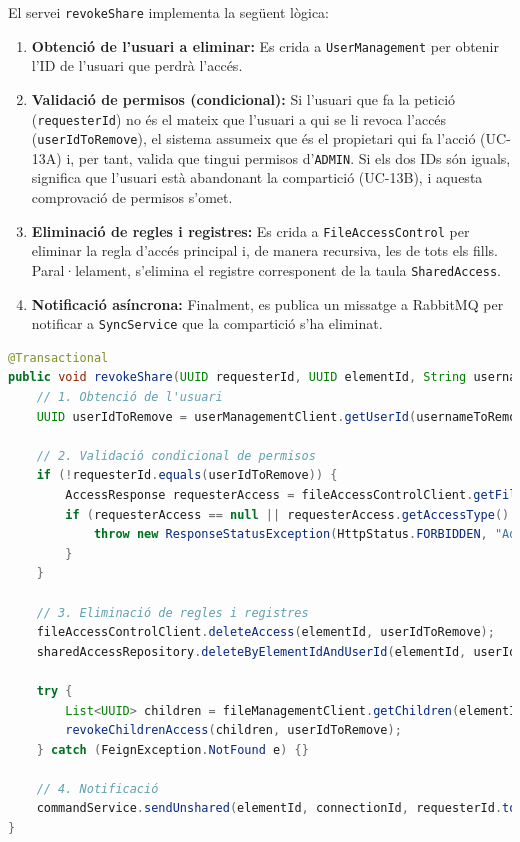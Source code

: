 El servei \texttt{revokeShare} implementa la següent lògica:
\begin{enumerate}
    \item \textbf{Obtenció de l'usuari a eliminar:} Es crida a \texttt{UserManagement} per obtenir l'ID de l'usuari que perdrà l'accés.
    \item \textbf{Validació de permisos (condicional):} Si l'usuari que fa la petició (\texttt{requesterId}) no és el mateix que l'usuari a qui se li revoca l'accés (\texttt{userIdToRemove}), el sistema assumeix que és el propietari qui fa l'acció (UC-13A) i, per tant, valida que tingui permisos d'\texttt{ADMIN}. Si els dos IDs són iguals, significa que l'usuari està abandonant la compartició (UC-13B), i aquesta comprovació de permisos s'omet.
    \item \textbf{Eliminació de regles i registres:} Es crida a \texttt{FileAccessControl} per eliminar la regla d'accés principal i, de manera recursiva, les de tots els fills. Paral·lelament, s'elimina el registre corresponent de la taula \texttt{SharedAccess}.
    \item \textbf{Notificació asíncrona:} Finalment, es publica un missatge a RabbitMQ per notificar a \texttt{SyncService} que la compartició s'ha eliminat.
\end{enumerate}

\begin{lstlisting}[language=Java, caption={Lògica per revocar un accés a `FileSharingService`}]
@Transactional
public void revokeShare(UUID requesterId, UUID elementId, String usernameToRemove, String connectionId) {
    // 1. Obtenció de l'usuari
    UUID userIdToRemove = userManagementClient.getUserId(usernameToRemove);

    // 2. Validació condicional de permisos
    if (!requesterId.equals(userIdToRemove)) {
        AccessResponse requesterAccess = fileAccessControlClient.getFileAccess(elementId, requesterId);
        if (requesterAccess == null || requesterAccess.getAccessType() != 3) { // 3 = ADMIN
            throw new ResponseStatusException(HttpStatus.FORBIDDEN, "Admin permission required...");
        }
    }
    
    // 3. Eliminació de regles i registres
    fileAccessControlClient.deleteAccess(elementId, userIdToRemove);
    sharedAccessRepository.deleteByElementIdAndUserId(elementId, userIdToRemove);

    try {
        List<UUID> children = fileManagementClient.getChildren(elementId);
        revokeChildrenAccess(children, userIdToRemove);
    } catch (FeignException.NotFound e) {}

    // 4. Notificació
    commandService.sendUnshared(elementId, connectionId, requesterId.toString());
}
\end{lstlisting}

